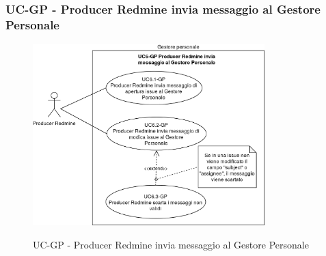 \subsubsection{UC\theuccount-GP - Producer Redmine invia messaggio al Gestore Personale}
    \begin{figure}[H]
		\centering
		\includegraphics[width=0.8\textwidth]{img/casi_d'uso/UC6.png}\\
		\caption{UC\theuccount-GP - Producer Redmine invia messaggio al Gestore Personale}
	\end{figure}
